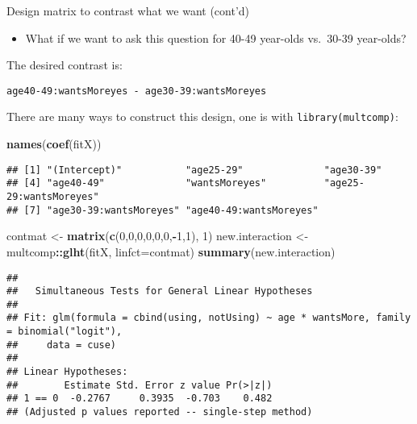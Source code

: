 \documentclass[
  ignorenonframetext,
]{beamer}
\newenvironment{Shaded}{\begin{snugshade}}{\end{snugshade}}
\newcommand{\DataTypeTok}[1]{\textcolor[rgb]{0.13,0.29,0.53}{#1}}
\newcommand{\DecValTok}[1]{\textcolor[rgb]{0.00,0.00,0.81}{#1}}
\newcommand{\KeywordTok}[1]{\textcolor[rgb]{0.13,0.29,0.53}{\textbf{#1}}}
\newcommand{\NormalTok}[1]{#1}
\newcommand{\OperatorTok}[1]{\textcolor[rgb]{0.81,0.36,0.00}{\textbf{#1}}}
\newcommand{\StringTok}[1]{\textcolor[rgb]{0.31,0.60,0.02}{#1}}
\providecommand{\tightlist}{%
  \setlength{\itemsep}{0pt}\setlength{\parskip}{0pt}}
\begin{document}
\begin{frame}[fragile]{Design matrix to contrast what we want (cont'd)}
\protect\hypertarget{design-matrix-to-contrast-what-we-want-contd}{}

\begin{itemize}
\tightlist
\item
  What if we want to ask this question for 40-49 year-olds vs.~30-39
  year-olds?
\end{itemize}

The desired contrast is:

\texttt{age40-49:wantsMoreyes\ -\ age30-39:wantsMoreyes}

There are many ways to construct this design, one is with
\texttt{library(multcomp)}:

\begin{Shaded}
\begin{Highlighting}[]
\KeywordTok{names}\NormalTok{(}\KeywordTok{coef}\NormalTok{(fitX))}
\end{Highlighting}
\end{Shaded}

\begin{verbatim}
## [1] "(Intercept)"           "age25-29"              "age30-39"             
## [4] "age40-49"              "wantsMoreyes"          "age25-29:wantsMoreyes"
## [7] "age30-39:wantsMoreyes" "age40-49:wantsMoreyes"
\end{verbatim}

\begin{Shaded}
\begin{Highlighting}[]
\NormalTok{contmat <-}\StringTok{ }\KeywordTok{matrix}\NormalTok{(}\KeywordTok{c}\NormalTok{(}\DecValTok{0}\NormalTok{,}\DecValTok{0}\NormalTok{,}\DecValTok{0}\NormalTok{,}\DecValTok{0}\NormalTok{,}\DecValTok{0}\NormalTok{,}\DecValTok{0}\NormalTok{,}\OperatorTok{-}\DecValTok{1}\NormalTok{,}\DecValTok{1}\NormalTok{), }\DecValTok{1}\NormalTok{) }
\NormalTok{new.interaction <-}\StringTok{ }\NormalTok{multcomp}\OperatorTok{::}\KeywordTok{glht}\NormalTok{(fitX, }\DataTypeTok{linfct=}\NormalTok{contmat) }
\KeywordTok{summary}\NormalTok{(new.interaction)}
\end{Highlighting}
\end{Shaded}

\begin{verbatim}
## 
##   Simultaneous Tests for General Linear Hypotheses
## 
## Fit: glm(formula = cbind(using, notUsing) ~ age * wantsMore, family = binomial("logit"), 
##     data = cuse)
## 
## Linear Hypotheses:
##        Estimate Std. Error z value Pr(>|z|)
## 1 == 0  -0.2767     0.3935  -0.703    0.482
## (Adjusted p values reported -- single-step method)
\end{verbatim}

\end{frame}
\end{document}
